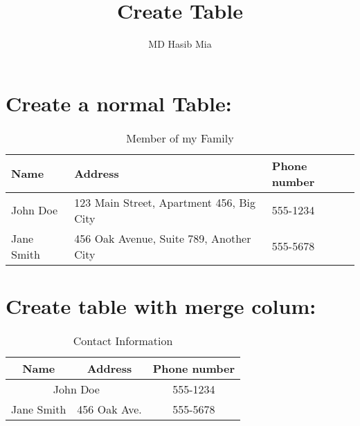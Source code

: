 \documentclass{article}
\title{Create Table}
\author{MD Hasib Mia}
\begin{document}
	\maketitle
	\tableofcontents
	\clearpage
	
	
	
	\section{Create a normal Table:}
	\begin{table}[h]
		\centering
		\begin{tabular}{|p{3cm}|p{5cm}|p{3cm}|}
			\hline
			Name & Address & Phone number \\
			 \hline
			John Doe & 123 Main Street, Apartment 456, Big City & 555-1234\\
			 \hline
			Jane Smith & 456 Oak Avenue, Suite 789, Another City & 555-5678 \\ 
			\hline
		\end{tabular}
		\caption{Member of my Family}
	\end{table}
	
	

\section{Create table with merge colum:}
\begin{table}[h]
	\centering
	\begin{tabular}{|c|c|c|}
		\hline
		Name & Address & Phone number \\ 
		\hline
		\multicolumn{2}{|c|}{John Doe} & 555-1234 \\
		 \hline
		Jane Smith & 456 Oak Ave. & 555-5678 \\
		 \hline
	\end{tabular}
	\caption{Contact Information}
\end{table}
\end{document}
